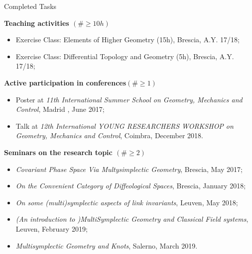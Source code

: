 \documentclass[handout,10pt]{beamer}
\begin{document}
\begin{frame}[shrink]{Completed Tasks}

\begin{exampleblock}{\CheckedBox \textbf{Teaching activities $(\#\geq 10h)$}}
	\begin{itemize}%
		\item Exercise Class: Elements of Higher Geometry (15h), Brescia, A.Y. 17/18;
		\item Exercise Class: Differential Topology and Geometry (5h), Brescia, A.Y. 17/18;	
	\end{itemize}
\end{exampleblock}

\begin{exampleblock}{\CheckedBox \textbf{Active participation in conferences$(\#\geq 1)$}}
	\begin{itemize}%
		\item Poster at \emph{11th International Summer School on Geometry, Mechanics and Control}, Madrid , June 2017;
		\item Talk at \emph{12th International YOUNG RESEARCHERS WORKSHOP on Geometry, Mechanics and Control}, Coimbra, December 2018.
	\end{itemize}
\end{exampleblock}

\begin{exampleblock}{\CheckedBox \textbf{Seminars on the research topic $(\#\geq 2)$}}
	\begin{itemize}%
		\item \emph{Covariant Phase Space Via Multysimplectic Geometry}, Brescia, May 2017;
		\item \emph{On the Convenient Category of Diffeological Spaces}, Brescia, January 2018;
		\item \emph{On some (multi)symplectic aspects of link invariants}, Leuven, May 2018;
		\item \emph{(An introduction to )MultiSymplectic Geometry and Classical Field systems}, Leuven, February 2019;
		\item \emph{Multisymplectic Geometry and Knots}, Salerno, March 2019.
	\end{itemize}	
\end{exampleblock}	

\end{frame}
\end{document}
